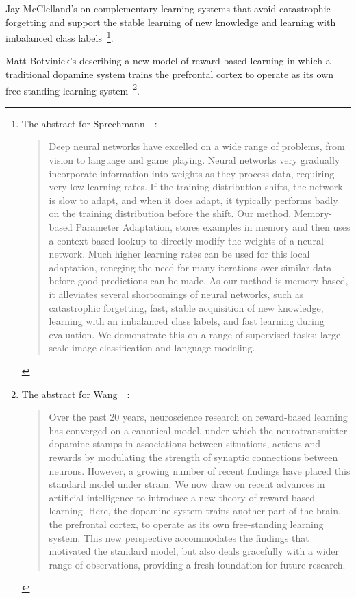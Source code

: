Jay McClelland's {} on complementary learning systems that avoid catastrophic forgetting and support the stable learning of new knowledge and learning with imbalanced class labels~\cite{SprechmannetalICLR-18}\footnote{%
%
  The abstract for Sprechmann~\etal{}~\cite{SprechmannetalICLR-18}:
%
  \begin{quotation}
%
   Deep neural networks have excelled on a wide range of problems, from vision to language and game playing. Neural networks very gradually incorporate information into weights as they process data, requiring very low learning rates. If the training distribution shifts, the network is slow to adapt, and when it does adapt, it typically performs badly on the training distribution before the shift. Our method, Memory-based Parameter Adaptation, stores examples in memory and then uses a context-based lookup to directly modify the weights of a neural network. Much higher learning rates can be used for this local adaptation, reneging the need for many iterations over similar data before good predictions can be made. As our method is memory-based, it alleviates several shortcomings of neural networks, such as catastrophic forgetting, fast, stable acquisition of new knowledge, learning with an imbalanced class labels, and fast learning during evaluation. We demonstrate this on a range of supervised tasks: large-scale image classification and language modeling.
%
  \end{quotation}}.

Matt Botvinick's {} describing a new model of reward-based learning in which a traditional dopamine system trains the prefrontal cortex to operate as its own free-standing learning system~\cite{WangetalNATURE-NEUROSCIENCE-18}\footnote{%
%
  The abstract for Wang~\etal{}~\cite{WangetalNATURE-NEUROSCIENCE-18}:
%
  \begin{quotation}
%
   Over the past 20 years, neuroscience research on reward-based learning has converged on a canonical model, under which the neurotransmitter dopamine stamps in associations between situations, actions and rewards by modulating the strength of synaptic connections between neurons. However, a growing number of recent findings have placed this standard model under strain. We now draw on recent advances in artificial intelligence to introduce a new theory of reward-based learning. Here, the dopamine system trains another part of the brain, the prefrontal cortex, to operate as its own free-standing learning system. This new perspective accommodates the findings that motivated the standard model, but also deals gracefully with a wider range of observations, providing a fresh foundation for future research.
%
  \end{quotation}}.


